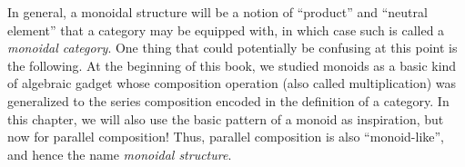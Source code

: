 
In general, a monoidal structure will be a notion of ``product'' and ``neutral element'' that a category may be equipped with, in which case such is called a \emph{monoidal category}.
One thing that could potentially be confusing at this point is the following.
At the beginning of this book, we studied monoids as a basic kind of algebraic gadget whose composition operation (also called multiplication) was generalized to the series composition encoded in the definition of a category.
In this chapter, we will also use the basic pattern of a monoid as inspiration, but now for parallel composition!
Thus, parallel composition is also ``monoid-like'', and hence the name \emph{monoidal structure}.
